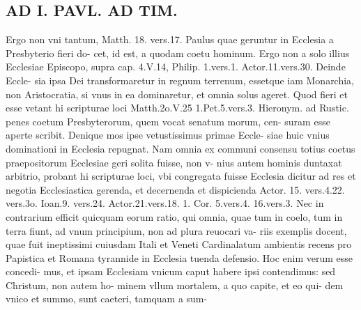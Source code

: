 \documentclass{article}
\begin{document}
\begin{pages}
\section*{AD I. PAVL. AD TIM. }
\marginpar{[ p.242 ]}\pstart Ergo non vni tantum, Matth. 18. vers.17. Paulus quae geruntur in Ecclesia a Presbyterio fieri do- cet, id est, a quodam coetu hominum. Ergo non a solo illius Ecclesiae Episcopo, supra cap. 4.V.14, Philip. 1.vers.1. Actor.11.vers.30. Deinde Eccle- sia ipsa Dei transformaretur in regnum terrenum, essetque iam Monarchia, non Aristocratia, si vnus in ea dominaretur, et omnia solus ageret. Quod fieri et esse vetant hi scripturae loci Matth.2o.V.25 1.Pet.5.vers.3. Hieronym. ad Rustic. penes coetum Presbyterorum, quem vocat senatum morum, cen- suram esse aperte scribit. Denique mos ipse vetustissimus primae Eccle- siae huic vnius dominationi in Ecclesia repugnat. Nam omnia ex communi consensu totius coetus praepositorum Ecclesiae geri solita fuisse, non v- nius autem hominis duntaxat arbitrio, probant hi scripturae loci, vbi congregata fuisse Ecclesia dicitur ad res et negotia Ecclesiastica gerenda, et decernenda et dispicienda Actor. 15. vers.4.22. vers.3o. Ioan.9. vers.24. Actor.21.vers.18. 1. Cor. 5.vers.4. 16.vers.3. Nec in contrarium efficit quicquam eorum ratio, qui omnia, quae tum in coelo, tum in terra fiunt, ad vnum principium, non ad plura reuocari va- riis exemplis docent, quae fuit ineptissimi cuiusdam Itali et Veneti Cardinalatum ambientis recens pro Papistica et Romana tyrannide in Ecclesia tuenda defensio. Hoc enim verum esse concedi- mus, et ipsam Ecclesiam vnicum caput habere ipsi contendimus: sed Christum, non autem ho- minem vllum mortalem, a quo capite, et eo qui- dem vnico et summo, sunt caeteri, tamquam a sum-  \pend

\end{pages}
\end{document}
